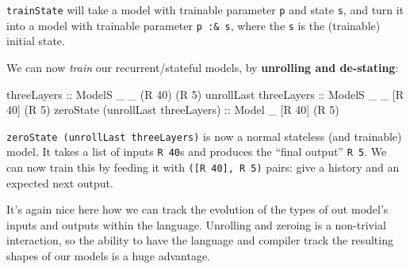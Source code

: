 \documentclass[]{article}
\newenvironment{Shaded}{}{}
\newcommand{\CommentTok}[1]{\textcolor[rgb]{0.38,0.63,0.69}{\textit{#1}}}
\newcommand{\DataTypeTok}[1]{\textcolor[rgb]{0.56,0.13,0.00}{#1}}
\newcommand{\DecValTok}[1]{\textcolor[rgb]{0.25,0.63,0.44}{#1}}
\newcommand{\FunctionTok}[1]{\textcolor[rgb]{0.02,0.16,0.49}{#1}}
\newcommand{\NormalTok}[1]{#1}
\newcommand{\OperatorTok}[1]{\textcolor[rgb]{0.40,0.40,0.40}{#1}}
\newcommand{\OtherTok}[1]{\textcolor[rgb]{0.00,0.44,0.13}{#1}}
\begin{document}
\begin{Shaded}
\end{Shaded}

\texttt{trainState} will take a model with trainable parameter \texttt{p} and
state \texttt{s}, and turn it into a model with trainable parameter
\texttt{p\ :\&\ s}, where the \texttt{s} is the (trainable) initial state.

We can now \emph{train} our recurrent/stateful models, by \textbf{unrolling and
de-stating}:

\begin{Shaded}
\begin{Highlighting}[]
\OtherTok{threeLayers                        ::} \DataTypeTok{ModelS}\NormalTok{ \_ \_ (}\DataTypeTok{R} \DecValTok{40}\NormalTok{) (}\DataTypeTok{R} \DecValTok{5}\NormalTok{)}
\NormalTok{unrollLast}\OtherTok{ threeLayers             ::} \DataTypeTok{ModelS}\NormalTok{ \_ \_ [}\DataTypeTok{R} \DecValTok{40}\NormalTok{] (}\DataTypeTok{R} \DecValTok{5}\NormalTok{)}
\NormalTok{zeroState (unrollLast threeLayers)}\OtherTok{ ::} \DataTypeTok{Model}\NormalTok{  \_   [}\DataTypeTok{R} \DecValTok{40}\NormalTok{] (}\DataTypeTok{R} \DecValTok{5}\NormalTok{)}
\end{Highlighting}
\end{Shaded}

\texttt{zeroState\ (unrollLast\ threeLayers)} is now a normal stateless (and
trainable) model. It takes a list of inputs \texttt{R\ 40}s and produces the
``final output'' \texttt{R\ 5}. We can now train this by feeding it with
\texttt{({[}R\ 40{]},\ R\ 5)} pairs: give a history and an expected next output.

It's again nice here how we can track the evolution of the types of out model's
inputs and outputs within the language. Unrolling and zeroing is a non-trivial
interaction, so the ability to have the language and compiler track the
resulting shapes of our models is a huge advantage.
\end{document}
